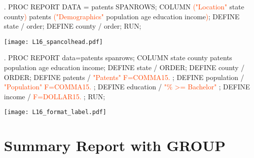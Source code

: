 \begin{frame}[fragile]
\begin{center}
\end{center}
\begin{code}{.}
PROC REPORT DATA = patents SPANROWS;
  COLUMN \textcolor{OrangeRed}{("Location"} state county\textcolor{OrangeRed}{)}
         patents
         \textcolor{OrangeRed}{("Demographics"} population age education income\textcolor{OrangeRed}{)};
  DEFINE state / order;
  DEFINE county / order;
RUN;
\end{code}
\emp
\vspace{5pt}
\texttt{[image: L16\_spancolhead.pdf]}
\end{frame}

\begin{frame}[fragile]
\begin{center}
\end{center}
\begin{code}{.}
PROC REPORT data=patents spanrows;
   COLUMN state county patents population age education income;
   DEFINE state / ORDER;
   DEFINE county / ORDER;
   DEFINE patents /  \textcolor{OrangeRed}{"Patents" F=COMMA15.} ;
   DEFINE population / \textcolor{OrangeRed}{"Population" F=COMMA15.} ;
   DEFINE education /  \textcolor{OrangeRed}{"\% >= Bachelor"} ;
   DEFINE income / \textcolor{OrangeRed}{F=DOLLAR15.} ;
RUN;
\end{code}
\emp
\vspace{5pt}
\texttt{[image: L16\_format\_label.pdf]}
\end{frame}

\section[Summary Report with GROUP]{Summary Report with GROUP}
